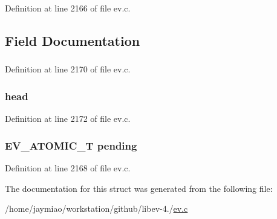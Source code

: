 \-Definition at line 2166 of file ev.\-c.



\subsection{\-Field \-Documentation}
\hypertarget{struct_a_n_s_i_g_a2ac4652fbc25ea6c30d7158cfe5e7698}{
\subsubsection[{\-E\-V\-\_\-\-P}]{}}\label{struct_a_n_s_i_g_a2ac4652fbc25ea6c30d7158cfe5e7698}


\-Definition at line 2170 of file ev.\-c.

\hypertarget{struct_a_n_s_i_g_adfe98a723723ae76746a9a793f2bd862}{
\subsubsection[{head}]{ {\bf head}}}\label{struct_a_n_s_i_g_adfe98a723723ae76746a9a793f2bd862}


\-Definition at line 2172 of file ev.\-c.

\hypertarget{struct_a_n_s_i_g_a63e6db022c8882b3af1efcdd00e5dbd4}{
\subsubsection[{pending}]{\setlength{\rightskip}{0pt plus 5cm}\-E\-V\-\_\-\-A\-T\-O\-M\-I\-C\-\_\-\-T {\bf pending}}}\label{struct_a_n_s_i_g_a63e6db022c8882b3af1efcdd00e5dbd4}


\-Definition at line 2168 of file ev.\-c.



\-The documentation for this struct was generated from the following file\-:\begin{DoxyCompactItemize}
\item 
/home/jaymiao/workstation/github/libev-\/4./\hyperlink{ev_8c}{ev.\-c}\end{DoxyCompactItemize}
